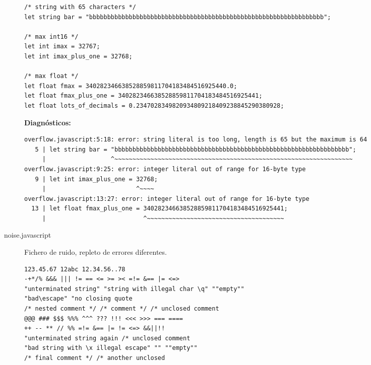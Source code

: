 \documentclass[a4paper]{CSMakotoTechnicalReport}
\begin{document}
\begin{appendices}
\begin{description}
\begin{lstlisting}
/* string with 65 characters */
let string bar = "bbbbbbbbbbbbbbbbbbbbbbbbbbbbbbbbbbbbbbbbbbbbbbbbbbbbbbbbbbbbbbbbb";

/* max int16 */
let int imax = 32767;
let int imax_plus_one = 32768;

/* max float */
let float fmax = 340282346638528859811704183484516925440.0;
let float fmax_plus_one = 340282346638528859811704183484516925441;
let float lots_of_decimals = 0.2347028349820934809218409238845290380928;
            \end{lstlisting}

            \textbf{Diagnósticos:}
            \begin{lstlisting}
overflow.javascript:5:18: error: string literal is too long, length is 65 but the maximum is 64
   5 | let string bar = "bbbbbbbbbbbbbbbbbbbbbbbbbbbbbbbbbbbbbbbbbbbbbbbbbbbbbbbbbbbbbbbbb";
     |                  ^~~~~~~~~~~~~~~~~~~~~~~~~~~~~~~~~~~~~~~~~~~~~~~~~~~~~~~~~~~~~~~~~~~
overflow.javascript:9:25: error: integer literal out of range for 16-byte type
   9 | let int imax_plus_one = 32768;
     |                         ^~~~~
overflow.javascript:13:27: error: integer literal out of range for 16-byte type
  13 | let float fmax_plus_one = 340282346638528859811704183484516925441;
     |                           ^~~~~~~~~~~~~~~~~~~~~~~~~~~~~~~~~~~~~~~
            \end{lstlisting}
            \newpage

        \item[noise.javascript] Fichero de ruido, repleto de errores diferentes.
            \begin{lstlisting}
123.45.67 12abc 12.34.56..78
-+*/% &&& ||| != == <= >= >< =!= &== |= <=>
"unterminated string" "string with illegal char \q" ""empty""
"bad\escape" "no closing quote
/* nested comment */ /* comment */ /* unclosed comment
@@@ ### $$$ %%% ^^^ ??? !!! <<< >>> === ====
++ -- ** // %% =!= &== |= != <=> &&||!!
"unterminated string again /* unclosed comment
"bad string with \x illegal escape" "" ""empty""
/* final comment */ /* another unclosed
            \end{lstlisting}


\end{description}
\end{appendices}
\end{document}

